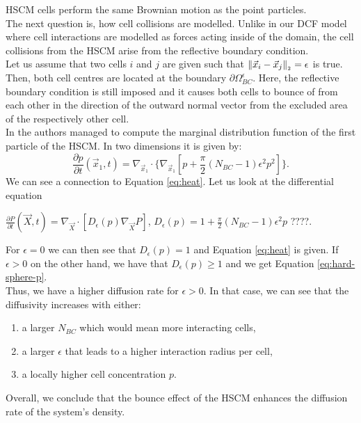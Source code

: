 HSCM cells perform the same Brownian motion as the point particles. \\
The next question is, how cell collisions are modelled. 
Unlike in our DCF model where cell interactions are modelled as forces acting inside of the domain, the cell collisions from the HSCM arise from the reflective boundary condition. \\
Let us assume that two cells $i$ and $j$ are given such that $\norm[\vec{x}_i - \vec{x}_j] = \epsilon$ is true. 
Then, both cell centres are located at the boundary $\partial \Omega_{BC}^{\epsilon}$. 
Here, the reflective boundary condition is still imposed and it causes both cells to bounce of from each other in the direction of the outward normal vector from the excluded area of the respectively other cell. \\ 

In \cite{Bruna2012} the authors managed to compute the marginal distribution function of the first particle of the HSCM. 
In two dimensions it is given by:
\begin{equation}
    \frac{\partial p}{\partial t}(\vec{x}_1, t) = \nabla_{\vec{x}_1} \cdot \{\nabla_{\vec{x}_1}[p + \frac{\pi}{2}(N_{BC} - 1)\epsilon^2 p^2]\}.
    \label{eq:hard-sphere-p}
\end{equation}
We can see a connection to Equation \ref{eq:heat}. 
Let us look at the differential equation
\begin{center}
    $\frac{\partial P}{\partial t}(\vec{X}, t) =  \nabla_{\vec{X}} \cdot [D_{\epsilon}(p) \nabla_{\vec{X}} P]$,
    $D_{\epsilon}(p) = 1 + \frac{\pi}{2}(N_{BC}-1)\epsilon^2 p$ ????.
\end{center}
For $\epsilon = 0$ we can then see that $D_{\epsilon}(p) = 1$ and Equation \ref{eq:heat} is given. 
If $\epsilon > 0$ on the other hand, we have that $D_{\epsilon}(p) \geq 1$ and we get Equation \ref{eq:hard-sphere-p}. \\
Thus, we have a higher diffusion rate for $\epsilon > 0$. 
In that case, we can see that the diffusivity increases with either:
\begin{enumerate}[label=(\alph*)]
    \item a larger $N_{BC}$ which would mean more interacting cells,
    \item a larger $\epsilon$ that leads to a higher interaction radius per cell,
    \item a locally higher cell concentration $p$. 
\end{enumerate}
Overall, we conclude that the bounce effect of the HSCM enhances the diffusion rate of the system's density.






